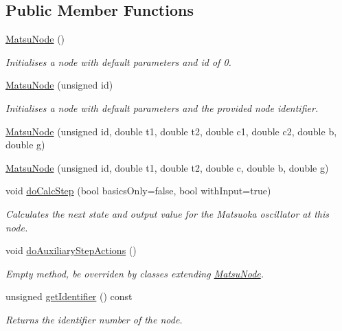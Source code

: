 \subsection*{Public Member Functions}
\begin{DoxyCompactItemize}
\item 
\mbox{\hyperlink{classMatsuNode_ad0f98260ecf5e9b0173ace6ac087114e}{Matsu\+Node}} ()
\begin{DoxyCompactList}\small\item\em Initialises a node with default parameters and id of 0. \end{DoxyCompactList}\item 
\mbox{\hyperlink{classMatsuNode_a0c502c97d26d0e87831e70814d7f1576}{Matsu\+Node}} (unsigned id)
\begin{DoxyCompactList}\small\item\em Initialises a node with default parameters and the provided node identifier. \end{DoxyCompactList}\item 
\mbox{\hyperlink{classMatsuNode_a424409287edb672d04f85a6b842f1a07}{Matsu\+Node}} (unsigned id, double t1, double t2, double c1, double c2, double b, double g)
\item 
\mbox{\hyperlink{classMatsuNode_aef8572f9660b43e67d1c3fe83693eb96}{Matsu\+Node}} (unsigned id, double t1, double t2, double c, double b, double g)
\item 
void \mbox{\hyperlink{classMatsuNode_a10c0280241d0be2e50d89af136d279dc}{do\+Calc\+Step}} (bool basics\+Only=false, bool with\+Input=true)
\begin{DoxyCompactList}\small\item\em Calculates the next state and output value for the Matsuoka oscillator at this node. \end{DoxyCompactList}\item 
void \mbox{\hyperlink{classMatsuNode_a7a537f1cb21eee2652086d022ab41eb8}{do\+Auxiliary\+Step\+Actions}} ()
\begin{DoxyCompactList}\small\item\em Empty method, be overriden by classes extending \mbox{\hyperlink{classMatsuNode}{Matsu\+Node}}. \end{DoxyCompactList}\item 
unsigned \mbox{\hyperlink{classMatsuNode_ac0c4e1164c131fce54db22db8384ac7d}{get\+Identifier}} () const
\begin{DoxyCompactList}\small\item\em Returns the identifier number of the node. \end{DoxyCompactList}\item 

\end{DoxyCompactItemize}
